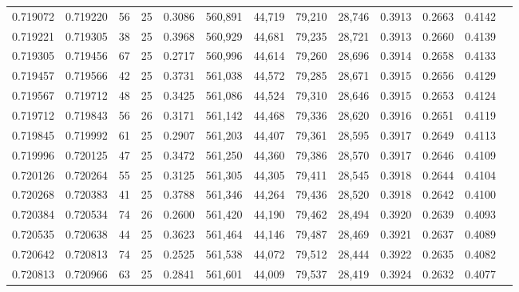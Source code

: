 \begin{tabular}{rrrrrrrrrrrrr}
0.719072 & 0.719220 &    56 &  25 &                                     0.3086 & 560,891 &  44,719 &  79,210 &  28,746 & 0.3913 & 0.2663 & 0.4142 \\
0.719221 & 0.719305 &    38 &  25 &                                     0.3968 & 560,929 &  44,681 &  79,235 &  28,721 & 0.3913 & 0.2660 & 0.4139 \\
0.719305 & 0.719456 &    67 &  25 &                                     0.2717 & 560,996 &  44,614 &  79,260 &  28,696 & 0.3914 & 0.2658 & 0.4133 \\
0.719457 & 0.719566 &    42 &  25 &                                     0.3731 & 561,038 &  44,572 &  79,285 &  28,671 & 0.3915 & 0.2656 & 0.4129 \\
0.719567 & 0.719712 &    48 &  25 &                                     0.3425 & 561,086 &  44,524 &  79,310 &  28,646 & 0.3915 & 0.2653 & 0.4124 \\
0.719712 & 0.719843 &    56 &  26 &                                     0.3171 & 561,142 &  44,468 &  79,336 &  28,620 & 0.3916 & 0.2651 & 0.4119 \\
0.719845 & 0.719992 &    61 &  25 &                                     0.2907 & 561,203 &  44,407 &  79,361 &  28,595 & 0.3917 & 0.2649 & 0.4113 \\
0.719996 & 0.720125 &    47 &  25 &                                     0.3472 & 561,250 &  44,360 &  79,386 &  28,570 & 0.3917 & 0.2646 & 0.4109 \\
0.720126 & 0.720264 &    55 &  25 &                                     0.3125 & 561,305 &  44,305 &  79,411 &  28,545 & 0.3918 & 0.2644 & 0.4104 \\
0.720268 & 0.720383 &    41 &  25 &                                     0.3788 & 561,346 &  44,264 &  79,436 &  28,520 & 0.3918 & 0.2642 & 0.4100 \\
0.720384 & 0.720534 &    74 &  26 &                                     0.2600 & 561,420 &  44,190 &  79,462 &  28,494 & 0.3920 & 0.2639 & 0.4093 \\
0.720535 & 0.720638 &    44 &  25 &                                     0.3623 & 561,464 &  44,146 &  79,487 &  28,469 & 0.3921 & 0.2637 & 0.4089 \\
0.720642 & 0.720813 &    74 &  25 &                                     0.2525 & 561,538 &  44,072 &  79,512 &  28,444 & 0.3922 & 0.2635 & 0.4082 \\
0.720813 & 0.720966 &    63 &  25 &                                     0.2841 & 561,601 &  44,009 &  79,537 &  28,419 & 0.3924 & 0.2632 & 0.4077 \\

\end{tabular}

